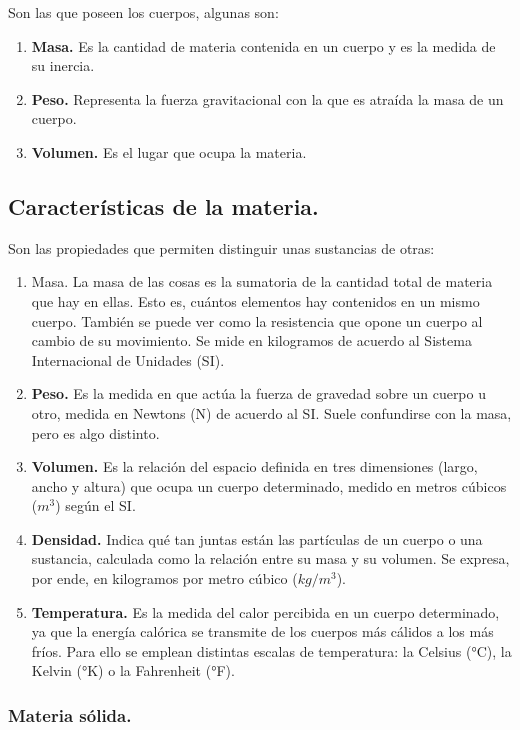 \documentclass[14pt]{extarticle}
\begin{document}
Son las que poseen los cuerpos, algunas son:
\begin{enumerate}[label=\roman*)]
\item \textbf{Masa.} Es la cantidad de materia contenida en un cuerpo y es la medida de su inercia.
\item \textbf{Peso.} Representa la fuerza gravitacional con la que es atraída la masa de un cuerpo.
\item \textbf{Volumen.} Es el lugar que ocupa la materia.
\end{enumerate}

\subsection{Características de la materia.}

Son las propiedades que permiten distinguir unas sustancias de otras:
\begin{enumerate}
\item Masa. La masa de las cosas es la sumatoria de la cantidad total de materia que hay en ellas. Esto es, cuántos elementos hay contenidos en un mismo cuerpo. También se puede ver como la resistencia que opone un cuerpo al cambio de su movimiento. Se mide en kilogramos de acuerdo al Sistema Internacional de Unidades (SI).
\item \textbf{Peso.} Es la medida en que actúa la fuerza de gravedad sobre un cuerpo u otro, medida en Newtons (N) de acuerdo al SI. Suele confundirse con la masa, pero es algo distinto.
\item \textbf{Volumen.} Es la relación del espacio definida en tres dimensiones (largo, ancho y altura) que ocupa un cuerpo determinado, medido en metros cúbicos ($m^{3}$) según el SI.
\item \textbf{Densidad.} Indica qué tan juntas están las partículas de un cuerpo o una sustancia, calculada como la relación entre su masa y su volumen. Se expresa, por ende, en kilogramos por metro cúbico ($kg/m^{3}$).
\item \textbf{Temperatura.} Es la medida del calor percibida en un cuerpo determinado, ya que la energía calórica se transmite de los cuerpos más cálidos a los más fríos. Para ello se emplean distintas escalas de temperatura: la Celsius (°C), la Kelvin (°K) o la Fahrenheit (°F).
\end{enumerate}

\subsubsection{Materia sólida.}
\end{document}
